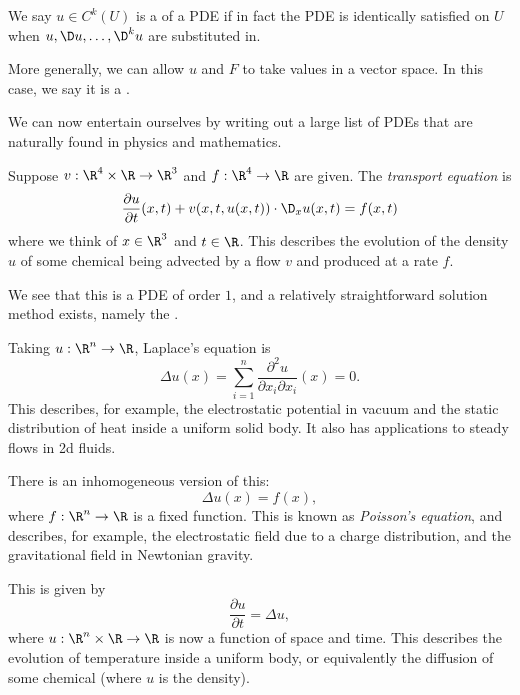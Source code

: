 \documentclass[a4paper]{article}
\begin{document}
\begin{defi}
  We say $u \in C^k(U)$ is a  of a PDE if in fact the PDE is identically satisfied on $U$ when $u, \D u, \ldots, \D^k u$ are substituted in.
\end{defi}

More generally, we can allow $u$ and $F$ to take values in a vector space. In this case, we say it is a .

We can now entertain ourselves by writing out a large list of PDEs that are naturally found in physics and mathematics.
\begin{eg}
  Suppose $v: \R^4 \times \R \to \R^3$ and $f: \R^4 \to \R$ are given. The \emph{transport equation} is
  \[
    \frac{\partial u}{\partial t}(x, t) + v(x, t, u(x, t)) \cdot \D_x u(x, t) = f(x, t)
  \]
  where we think of $x \in \R^3$ and $t \in \R$. This describes the evolution of the density $u$ of some chemical being advected by a flow $v$ and produced at a rate $f$.

  We see that this is a PDE of order $1$, and a relatively straightforward solution method exists, namely the .
\end{eg}

\begin{eg}
  Taking $u: \R^n \to \R$, Laplace's equation is
  \[
    \Delta u(x) = \sum_{i = 1}^n \frac{\partial^2 u}{\partial x_i \partial x_i} (x) = 0.
  \]
  This describes, for example, the electrostatic potential in vacuum and the static distribution of heat inside a uniform solid body. It also has applications to steady flows in 2d fluids.

  There is an inhomogeneous version of this:
  \[
    \Delta u(x) = f(x),
  \]
  where $f: \R^n \to \R$ is a fixed function. This is known as \emph{Poisson's equation}, and describes, for example, the electrostatic field due to a charge distribution, and the gravitational field in Newtonian gravity.
\end{eg}

\begin{eg}
  This is given by
  \[
    \frac{\partial u}{\partial t} = \Delta u,
  \]
  where $u: \R^n \times \R \to \R$ is now a function of space and time. This describes the evolution of temperature inside a uniform body, or equivalently the diffusion of some chemical (where $u$ is the density).
\end{eg}
\end{document}
